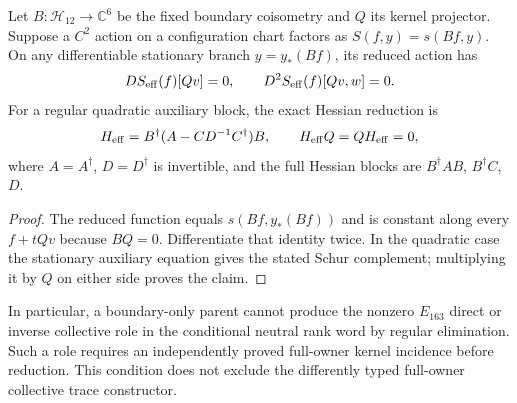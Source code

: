 \documentclass[12pt,a4paper]{article}
\begin{document}
\begin{proposition}
\label{p5:prop:v246-boundary-elimination-no-kernel}
Let $B:\mathcal H_{12}\to\mathbb C^6$ be the fixed boundary
coisometry and $Q$ its kernel projector. Suppose a $C^2$ action on a
configuration chart factors as $S(f,y)=s(Bf,y)$. On any differentiable
stationary branch $y=y_*(Bf)$, its reduced action has
\[
 D S_{\rm eff}(f)[Qv]=0,\qquad
 D^2S_{\rm eff}(f)[Qv,w]=0.
\]
For a regular quadratic auxiliary block, the exact Hessian reduction is
\[
 H_{\rm eff}=B^\dagger(A-CD^{-1}C^\dagger)B,
 \qquad H_{\rm eff}Q=QH_{\rm eff}=0,
\]
where $A=A^\dagger$, $D=D^\dagger$ is invertible, and the full
Hessian blocks are $B^\dagger AB$, $B^\dagger C$, $D$.
\end{proposition}
\begin{proof}
The reduced function equals
$s(Bf,y_*(Bf))$ and is constant along every $f+tQv$ because $BQ=0$.
Differentiate that identity twice. In the quadratic case the stationary
auxiliary equation gives the stated Schur complement; multiplying it
by $Q$ on either side proves the claim.
\end{proof}
In particular, a boundary-only parent cannot produce the nonzero
$E_{163}$ direct or inverse collective role in the conditional neutral
rank word by regular elimination. Such a role requires an independently
proved full-owner kernel incidence before reduction. This condition does
not exclude the differently typed full-owner collective trace constructor.



\end{document}
